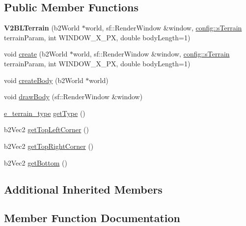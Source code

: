 \subsection*{Public Member Functions}
\begin{DoxyCompactItemize}
\item 
\mbox{\label{class_v2_b_l_terrain_a53dd7decc9140bbfdc482d40a7db55be}} 
{\bfseries V2\+B\+L\+Terrain} (b2\+World $\ast$world, sf\+::\+Render\+Window \&window, \mbox{\hyperlink{structconfig_1_1s_terrain}{config\+::s\+Terrain}} terrain\+Param, int W\+I\+N\+D\+O\+W\+\_\+\+X\+\_\+\+PX, double body\+Length=1)
\item 
void \mbox{\hyperlink{class_v2_b_l_terrain_ad9b52b119e46602caa16ec4bfbb3966a}{create}} (b2\+World $\ast$world, sf\+::\+Render\+Window \&window, \mbox{\hyperlink{structconfig_1_1s_terrain}{config\+::s\+Terrain}} terrain\+Param, int W\+I\+N\+D\+O\+W\+\_\+\+X\+\_\+\+PX, double body\+Length=1)
\item 
void \mbox{\hyperlink{class_v2_b_l_terrain_a51b40b5e3f6ee5ec1281baa7f7c076f9}{create\+Body}} (b2\+World $\ast$world)
\item 
void \mbox{\hyperlink{class_v2_b_l_terrain_aea63be5e3b6d05da4c3b5ce954429a4b}{draw\+Body}} (sf\+::\+Render\+Window \&window)
\item 
\mbox{\hyperlink{_terrain_8h_a6d0b7e83bb7325270c1162bece970fd8}{e\+\_\+terrain\+\_\+type}} \mbox{\hyperlink{class_v2_b_l_terrain_a4ac0574a992aadd7cfcad6eba6b55000}{get\+Type}} ()
\item 
b2\+Vec2 \mbox{\hyperlink{class_v2_b_l_terrain_a57bfd1489ee3074d08513865f2197897}{get\+Top\+Left\+Corner}} ()
\item 
b2\+Vec2 \mbox{\hyperlink{class_v2_b_l_terrain_a2a3dc6ef761a5ab416669ce5f793558b}{get\+Top\+Right\+Corner}} ()
\item 
b2\+Vec2 \mbox{\hyperlink{class_v2_b_l_terrain_a0534b144e38d8ffea797c3713b3d5380}{get\+Bottom}} ()
\end{DoxyCompactItemize}
\subsection*{Additional Inherited Members}


\subsection{Member Function Documentation}
\mbox{\label{class_v2_b_l_terrain_ad9b52b119e46602caa16ec4bfbb3966a}} 
